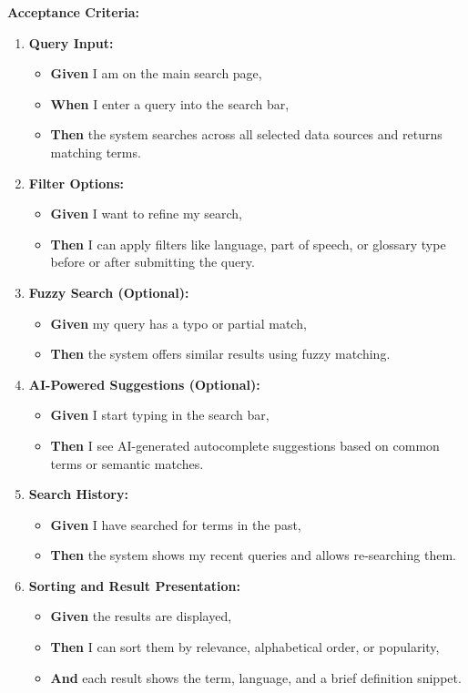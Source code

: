 \documentclass[12pt]{article}
\begin{document}
\vspace{1em}
\textbf{Acceptance Criteria:}
\begin{enumerate}
    \item \textbf{Query Input:}
    \begin{itemize}
        \item \textbf{Given} I am on the main search page,
        \item \textbf{When} I enter a query into the search bar,
        \item \textbf{Then} the system searches across all selected data sources and returns matching terms.
    \end{itemize}

    \item \textbf{Filter Options:}
    \begin{itemize}
        \item \textbf{Given} I want to refine my search,
        \item \textbf{Then} I can apply filters like language, part of speech, or glossary type before or after submitting the query.
    \end{itemize}

    \item \textbf{Fuzzy Search (Optional):}
    \begin{itemize}
        \item \textbf{Given} my query has a typo or partial match,
        \item \textbf{Then} the system offers similar results using fuzzy matching.
    \end{itemize}

    \item \textbf{AI-Powered Suggestions (Optional):}
    \begin{itemize}
        \item \textbf{Given} I start typing in the search bar,
        \item \textbf{Then} I see AI-generated autocomplete suggestions based on common terms or semantic matches.
    \end{itemize}

    \item \textbf{Search History:}
    \begin{itemize}
        \item \textbf{Given} I have searched for terms in the past,
        \item \textbf{Then} the system shows my recent queries and allows re-searching them.
    \end{itemize}

    \item \textbf{Sorting and Result Presentation:}
    \begin{itemize}
        \item \textbf{Given} the results are displayed,
        \item \textbf{Then} I can sort them by relevance, alphabetical order, or popularity,
        \item \textbf{And} each result shows the term, language, and a brief definition snippet.
    \end{itemize}
\end{enumerate}
\end{document}
